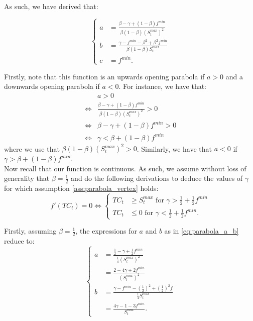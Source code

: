 \documentclass[12pt]{article}
\begin{document}
\begin{appendices}
        \noindent As such, we have derived that:
        
        \begin{equation} \label{eq:parabola_a_b}
		    \begin{cases}
		        a &= \frac{\beta - \gamma + (1-\beta)f^{min}}{\beta(1-\beta)\left(S^{max}_t\right)^2} \\
		        b &= \frac{\gamma - f^{min} - \beta^2 + \beta^2 f^{min}}{\beta(1-\beta)S^{max}_t} \\
		        c &= f^{min}.
		    \end{cases}
		\end{equation}
        
        Firstly, note that this function is an upwards opening parabola if $a>0$ and a downwards opening parabola if $a<0$. For instance, we have that:
        \begin{align*}
            & a > 0 \\
            \iff & \frac{\beta - \gamma + (1-\beta)f^{min}}{\beta(1-\beta)\left(S^{max}_t\right)^2} > 0 \\
            \iff & \beta - \gamma + (1-\beta)f^{min} > 0 \\
            \iff & \gamma < \beta + (1-\beta)f^{min}
        \end{align*}
        where we use that $\beta(1-\beta)\left(S^{max}_t\right)^2 > 0$. Similarly, we have that $a < 0$ if $\gamma > \beta + (1-\beta)f^{min}$. \\
        
        Now recall that our function is continuous. As such, we assume without loss of generality that $\beta = \frac{1}{2}$ and do the following derivations to deduce the values of $\gamma$ for which assumption \ref{ass:parabola_vertex} holds:
        \begin{equation*}
            f'(TC_t) = 0 \iff 
		    \begin{cases}
		        TC_t &\geq S^{max}_t \text{ for } \gamma > \frac{1}{2} + \frac{1}{2}f^{min} \\
		        TC_t &\leq 0 \text{ for } \gamma < \frac{1}{2} + \frac{1}{2}f^{min}.
		    \end{cases}
		\end{equation*}
		
		Firstly, assuming $\beta = \frac{1}{2}$, the expressions for $a$ and $b$ as in \eqref{eq:parabola_a_b} reduce to:
		\begin{equation} \label{eq:parabola_a_b_reduced}
		    \begin{cases}
		        a &= \frac{\frac{1}{2} - \gamma + \frac{1}{2}f^{min}}{\frac{1}{4}\left(S^{max}_t\right)^2} \\
		        &= \frac{2 - 4\gamma + 2f^{min}}{\left(S^{max}_t\right)^2} \\
		        b &= \frac{\gamma - f^{min} - \left(\frac{1}{2}\right)^2 + \left(\frac{1}{2}\right)^2 f}{\frac{1}{4}S^{max}_t} \\
		        &= \frac{4\gamma - 1 - 3f^{min}}{S^{max}_t}.
		    \end{cases}
		\end{equation}
		

\end{appendices}
\end{document}
